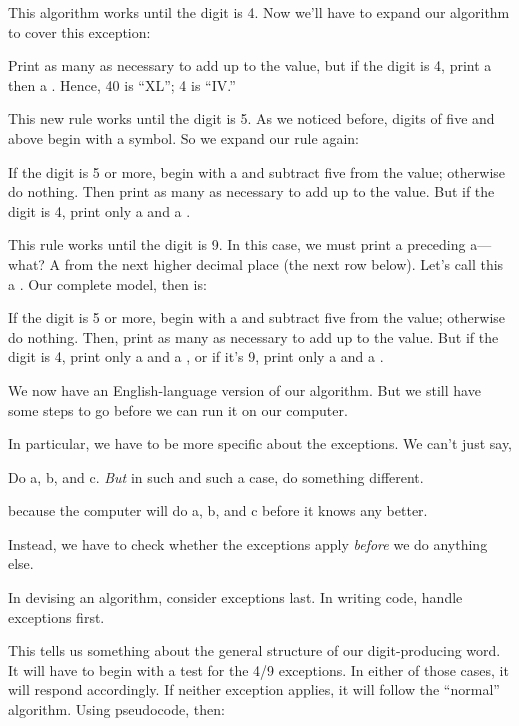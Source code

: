 This algorithm works until the digit is 4. Now we'll have to expand
our algorithm to cover this exception:

\begin{tfquot}
Print as many  as necessary to add up to the value, but if the digit
is 4, print a  then a .
Hence, 40 is ``XL''; 4 is ``IV.''
\end{tfquot}
This new rule works until the digit is 5. As we noticed before, digits of
five and above begin with a  symbol. So we expand our rule again:

\begin{tfquot}
If the digit is 5 or more, begin with a  and subtract five from the
value; otherwise do nothing. Then print as many  as necessary to
add up to the value. But if the digit is 4, print only a  and a .
\end{tfquot}
This rule works until the digit is 9. In this case, we must print a 
preceding a---what? A  from the next higher decimal place (the
next row below). Let's call this a . Our complete model, then is:

\begin{tfquot}
If the digit is 5 or more, begin with a  and subtract five from the
value; otherwise do nothing. Then, print as many  as necessary to
add up to the value. But if the digit is 4, print only a  and a ,
or if it's 9, print only a  and a .
\end{tfquot}
We now have an English-language version of our
algorithm. But we still
have some steps to go before we can run it on our computer.

In particular, we have to be more specific about the exceptions. We
can't just say,

\begin{tfquot}
Do a, b, and c. \emph{But} in such and such a case, do something different.
\end{tfquot}
because the computer will do a, b, and c before it knows any better.

Instead, we have to check whether the exceptions apply \emph{before} we
do anything else.

\begin{tip}
In devising an algorithm, consider exceptions last. In writing code, handle
exceptions first.
\end{tip}
This tells us something about the general structure of our digit-producing
word. It will have to begin with a test for the 4/9 exceptions. In
either of those cases, it will respond accordingly. If neither exception
applies, it will follow the ``normal'' algorithm. Using pseudocode, then:

